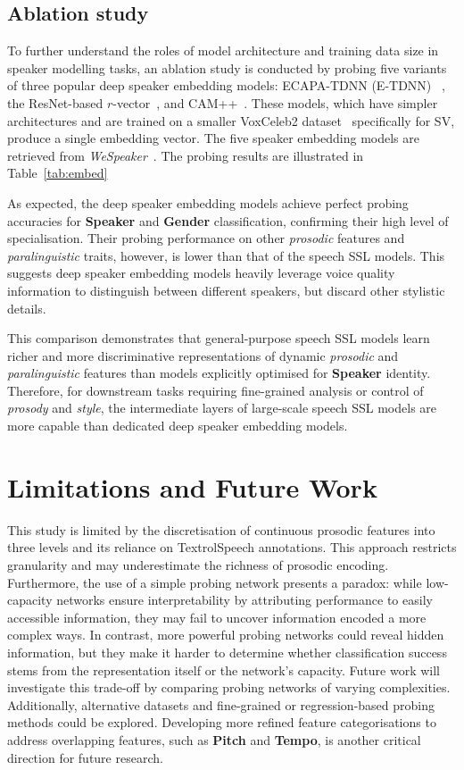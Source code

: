 \documentclass[cameraready]{Interspeech}
\begin{document}
\subsection{Ablation study}

To further understand the roles of model architecture and training data size in speaker modelling tasks, an ablation study is conducted by probing five variants of three popular deep speaker embedding models: ECAPA-TDNN (E-TDNN) ~\cite{ecapa-tdnn}, the ResNet-based $r$-vector~\cite{r-vector}, and CAM++~\cite{cam++}. These models, which have simpler architectures and are trained on a smaller VoxCeleb2 dataset~\cite{voxceleb2} specifically for SV, produce a single embedding vector. The five speaker embedding models are retrieved from \textit{WeSpeaker}~\cite{wespeaker}. The probing results are illustrated in Table~\ref{tab:embed}

As expected, the deep speaker embedding models achieve perfect probing accuracies for \textbf{Speaker} and \textbf{Gender} classification, confirming their high level of specialisation. Their probing performance on other \textit{prosodic} features and \textit{paralinguistic} traits, however, is lower than that of the speech SSL models. This suggests deep speaker embedding models heavily leverage voice quality information to distinguish between different speakers, but discard other stylistic details.

This comparison demonstrates that general-purpose speech SSL models learn richer and more discriminative representations of dynamic \textit{prosodic} and \textit{paralinguistic} features than models explicitly optimised for \textbf{Speaker} identity. Therefore, for downstream tasks requiring fine-grained analysis or control of \textit{prosody} and \textit{style}, the intermediate layers of large-scale speech SSL models are more capable than dedicated deep speaker embedding models.


\section{Limitations and Future Work}

This study is limited by the discretisation of continuous prosodic features into three levels and its reliance on TextrolSpeech annotations. This approach restricts granularity and may underestimate the richness of prosodic encoding. Furthermore, the use of a simple probing network presents a paradox: while low-capacity networks ensure interpretability by attributing performance to easily accessible information, they may fail to uncover information encoded a more complex ways. In contrast, more powerful probing networks could reveal hidden information, but they make it harder to determine whether classification success stems from the representation itself or the network's capacity. Future work will investigate this trade-off by comparing probing networks of varying complexities. Additionally, alternative datasets and fine-grained or regression-based probing methods could be explored. Developing more refined feature categorisations to address overlapping features, such as \textbf{Pitch} and \textbf{Tempo}, is another critical direction for future research.
\end{document}
